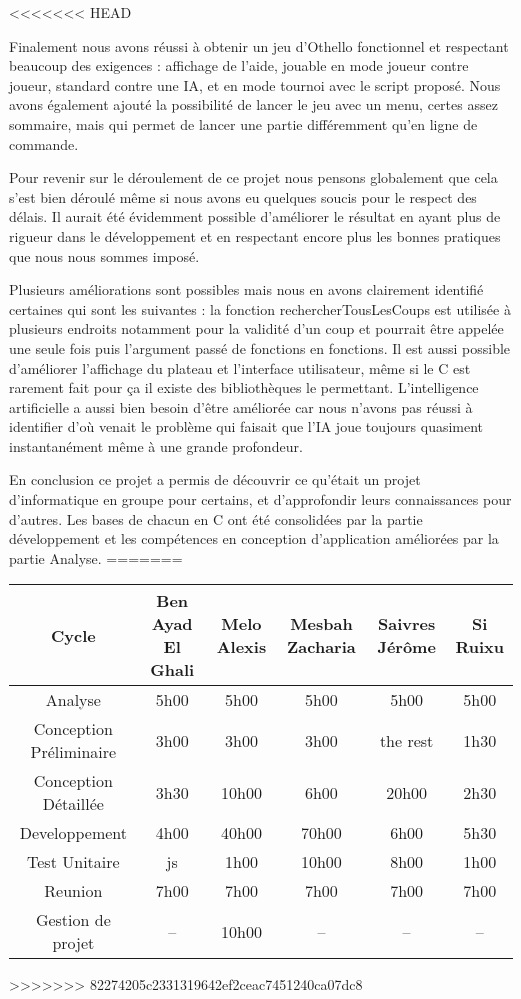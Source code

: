 <<<<<<< HEAD
\hspace{3em}

Finalement nous avons réussi à obtenir un jeu d’Othello fonctionnel et respectant beaucoup des exigences : affichage de l’aide, jouable en mode joueur contre joueur, standard contre une IA, et en mode tournoi avec le script proposé. Nous avons également ajouté la possibilité de lancer le jeu avec un menu, certes assez sommaire, mais qui permet de lancer une partie différemment qu’en ligne de commande.

Pour revenir sur le déroulement de ce projet nous pensons globalement que cela s’est bien déroulé même si nous avons eu quelques soucis pour le respect des délais. Il aurait été évidemment possible d’améliorer le résultat en ayant plus de rigueur dans le développement et en respectant encore plus les bonnes pratiques que nous nous sommes imposé.

Plusieurs améliorations sont possibles mais nous en avons clairement identifié certaines qui sont les suivantes : la fonction rechercherTousLesCoups est utilisée à plusieurs endroits notamment pour la validité d’un coup et pourrait être appelée une seule fois puis l’argument passé de fonctions en fonctions. Il est aussi possible d’améliorer l’affichage du plateau et l’interface utilisateur, même si le C est rarement fait pour ça il existe des bibliothèques le permettant. L’intelligence artificielle a aussi bien besoin d’être améliorée car nous n’avons pas réussi à identifier d’où venait le problème qui faisait que l’IA joue toujours quasiment instantanément même à une grande profondeur.



En conclusion ce projet a permis de découvrir ce qu’était un projet d’informatique en groupe pour certains, et d’approfondir leurs connaissances pour d’autres. Les bases de chacun en C ont été consolidées par la partie développement et les compétences en conception d’application améliorées par la partie Analyse.
=======
\begin{tabular}{|*{6}{c|}}
    \hline
   	Cycle  & Ben Ayad El Ghali  & Melo Alexis  & Mesbah Zacharia  & Saivres Jérôme  & Si Ruixu \\
    \hline
    Analyse  & 5h00  & 5h00  & 5h00  &  5h00  & 5h00  \\
    \hline
   	Conception Préliminaire & 3h00  & 3h00  & 3h00  & the rest & 1h30 \\
    \hline
   	Conception Détaillée & 3h30  & 10h00  & 6h00  & 20h00  & 2h30 \\
    \hline
   	 Developpement & 4h00  & 40h00  &  70h00 & 6h00  & 5h30 \\
    \hline
   	 Test Unitaire  &js  & 1h00  & 10h00  & 8h00 & 1h00 \\
    \hline
   	 Reunion  & 7h00  & 7h00  & 7h00  & 7h00 & 7h00 \\
    \hline
   	 Gestion de projet & -- & 10h00  & --  & -- & -- \\
    \hline
\end{tabular}
>>>>>>> 82274205c2331319642ef2ceac7451240ca07dc8
